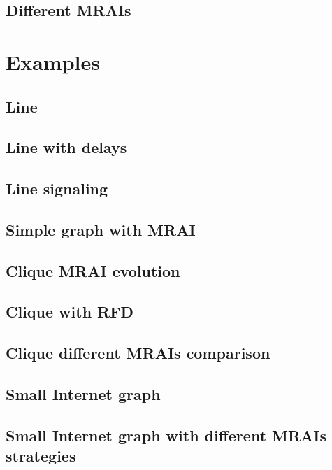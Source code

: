 \documentclass[10pt,journal,onecolumn]{IEEEtran}
\begin{document}
\subsection{Different MRAIs}
\label{subsec:MRAI_types}

\section{Examples}
\label{sec:examples}

\subsection{Line}
\label{subsec:ex_line}

\subsection{Line with delays}
\label{subsec:ex_line_delay}

\subsection{Line signaling}
\label{subsec:ex_line_signaling}

\subsection{Simple graph with MRAI}
\label{subsec:simple_graph_with_MRAI}

\subsection{Clique MRAI evolution}
\label{subsec:clique_evolution}

\subsection{Clique with RFD}
\label{subsec:clique_rfd}

\subsection{Clique different MRAIs comparison}
\label{subsec:clique_different_mrais}

\subsection{Small Internet graph}
\label{subsec:small_internet_graph}

\subsection{Small Internet graph with different MRAIs strategies}
\label{subsec:small_internet_graph_multiple_MRAIs}

\printindex


\end{document}
